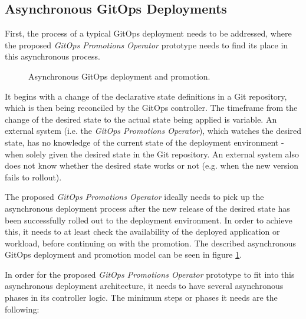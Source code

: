\subsection{Asynchronous GitOps Deployments}
\label{prototype:design:async-gitops-deployments}

First, the process of a typical GitOps deployment needs to be addressed, where
the proposed \textit{GitOps Promotions Operator} prototype needs to find its place in this asynchronous process.

\begin{figure}[h]
	\centering
	\caption{Asynchronous GitOps deployment and promotion.
	}
	\label{fig:async-gitops-promo-arch}	
\end{figure}

It begins with a change of the declarative state definitions in a Git repository,
which is then being reconciled by the GitOps controller.
The timeframe from the change of the desired state to the actual state being applied
is variable. An external system (i.e. the \textit{GitOps Promotions Operator}), which watches the desired state, has no knowledge of
the current state of the deployment environment - when solely given the desired state in the
Git repository. An external system also does not know whether the desired state works or not
(e.g. when the new version fails to rollout).

The proposed \textit{GitOps Promotions Operator} ideally needs to pick up
the asynchronous deployment process after the new release of the desired state
has been successfully rolled out to the deployment environment.
In order to achieve this,
it needs to at least check the availability of the deployed application or workload,
before continuing on with the promotion.
The described asynchronous GitOps deployment and promotion model can be seen in figure
\ref{fig:async-gitops-promo-arch}.

In order for the proposed \textit{GitOps Promotions Operator} prototype to fit into
this asynchronous deployment architecture,
it needs to have several asynchronous phases in its controller logic.
The minimum steps or phases it needs are the following:

